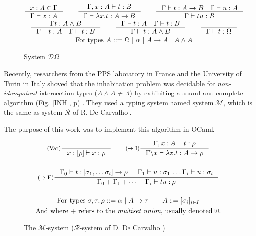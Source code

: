 \documentclass{article}
\begin{document}
\begin{figure}
    \begin{mdframed}
        \begin{gather*}
        \inference[]{x : A \in \Gamma}{\Gamma \vdash x : A}
        \qquad
        \inference[]{\Gamma, x : A \vdash t : B}{\Gamma \vdash \lambda x.t : A \rightarrow B}
        \qquad
        \inference[]{\Gamma \vdash t : A \rightarrow B \quad \Gamma \vdash u : A}{\Gamma \vdash tu : B}
        \\
        \inference[]{\Gamma t : A \wedge B}{\Gamma \vdash t : A \quad \Gamma \vdash t : B}
        \qquad
        \inference[]{\Gamma \vdash t : A \quad \Gamma \vdash t : B}{\Gamma \vdash t : A \wedge B}
        \qquad
        \inference[]{}{\Gamma \vdash t : \Omega}
        \\ \text{For types } A ::= \Omega \ | \ \alpha \ | \ A \rightarrow A \ | \ A \wedge A
        \end{gather*}
    \end{mdframed}
    \caption{System $\mathcal{D}\Omega$}
    \label{SDO}
\end{figure}

Recently, researchers from the PPS laboratory in France and the University of Turin in Italy shoved that the inhabitation problem was decidable for \emph{non-idempotent} intersection types ($A\wedge A\neq A$) by exhibiting a sound and complete algorithm (Fig. \ref{INH}, p\pageref{INH}) \cite{Kes}. They used a typing system named system $\mathcal{M}$, which is the same as system $\mathcal{R}$ of R. De Carvalho \cite{DeCarvalho}.

The purpose of this work was to implement this algorithm in OCaml.

\begin{figure}[h]
    \begin{mdframed}
        \begin{gather*}
        \inference[(Var)]{}{x : [\rho] \vdash x : \rho}
        \qquad
        \inference[($\rightarrow$ I)]{\Gamma, x : A \vdash t : \rho}{\Gamma \backslash x \vdash \lambda x.t : A \rightarrow \rho}
        \\ \\
        \inference[($\rightarrow$ E)]{\Gamma_0 \vdash t : [\sigma_1, \ldots \sigma_i] \rightarrow \rho 
            & \Gamma_1 \vdash u : \sigma_1, \ldots \Gamma_i \vdash u : \sigma_i}
        {\Gamma_0 + \Gamma_1 + \cdots + \Gamma_i \vdash tu : \rho}
        \\ \\
        \text{For types } \sigma, \tau, \rho ::= \alpha \ | \ A \rightarrow \tau \qquad A ::= [\sigma_i]_{i \in I}
        \\ \text{And where $+$ refers to the \emph{multiset union}, usually denoted $\uplus$.}
        \end{gather*}
    \end{mdframed}
    \caption{The  $\mathcal{M}$-system ($\mathcal{R}$-system of D. De Carvalho \cite{DeCarvalho})}
    \label{SM}
\end{figure}
\end{document}
